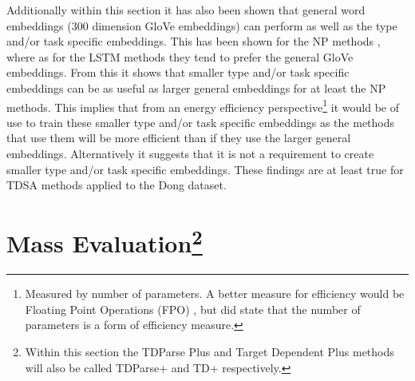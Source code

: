 Additionally within this section it has also been shown that general word embeddings (300 dimension GloVe embeddings) can perform as well as the type and/or task specific embeddings. This has been shown for the NP methods \citep{vo2015target}, where as for the LSTM methods \citep{tang-etal-2016-effective} they tend to prefer the general GloVe embeddings. From this it shows that smaller type and/or task specific embeddings can be as useful as larger general embeddings for at least the NP methods. This implies that from an energy efficiency perspective\footnote{Measured by number of parameters. A better measure for efficiency would be Floating Point Operations (FPO) \citep{schwartz2019green}, but \citet{schwartz2019green} did state that the number of parameters is a form of efficiency measure.} it would be of use to train these smaller type and/or task specific embeddings as the methods that use them will be more efficient than if they use the larger general embeddings. Alternatively it suggests that it is not a requirement to create smaller type and/or task specific embeddings. These findings are at least true for TDSA methods applied to the Dong dataset.

\section[Mass Evaluation]{Mass Evaluation\footnote{Within this section the TDParse Plus and Target Dependent Plus methods will also be called TDParse+ and TD+ respectively.}}
\label{section:repro_mass_eval}


